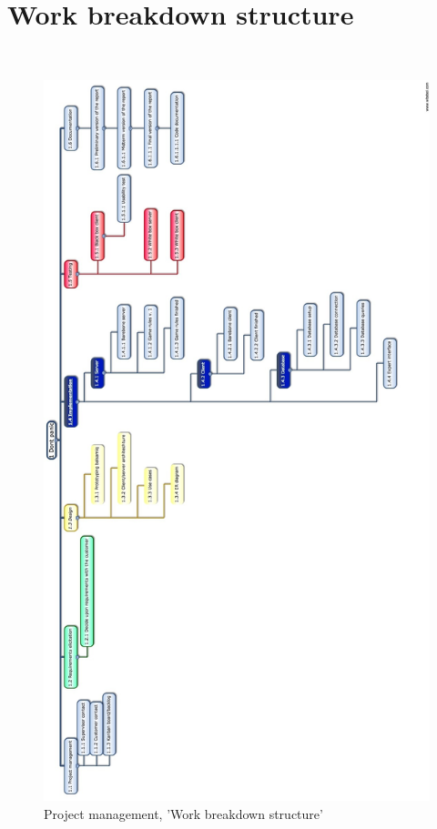 \section{Work breakdown structure}
\\
\begin{figure}[H]
  \centering
    \includegraphics[width=1.0\textwidth]{img/wbs.jpeg}
  \caption{Project management, 'Work breakdown structure'} 
  \label{fig:WBS}
\end{figure}
\\

